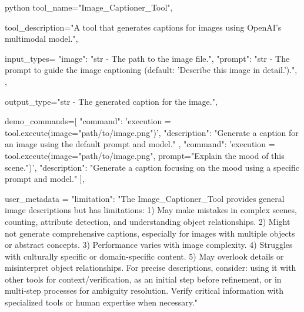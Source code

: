 \begin{codecolorbox}{python}
tool_name="Image_Captioner_Tool",

tool_description="A tool that generates captions for images using OpenAI's multimodal model.",

input_types={
    "image": "str - The path to the image file.",
    "prompt": "str - The prompt to guide the image captioning (default: 'Describe this image in detail.').",
},

output_type="str - The generated caption for the image.",

demo_commands=[
    {
        "command": 'execution = tool.execute(image="path/to/image.png")',
        "description": "Generate a caption for an image using the default prompt and model."
    },
    {
        "command": 'execution = tool.execute(image="path/to/image.png", prompt="Explain the mood of this scene.")',
        "description": "Generate a caption focusing on the mood using a specific prompt and model."
    }
],

user_metadata = {
    "limitation": "The Image_Captioner_Tool provides general image descriptions but has limitations: 1) May make mistakes in complex scenes, counting, attribute detection, and understanding object relationships. 2) Might not generate comprehensive captions, especially for images with multiple objects or abstract concepts. 3) Performance varies with image complexity. 4) Struggles with culturally specific or domain-specific content. 5) May overlook details or misinterpret object relationships. For precise descriptions, consider: using it with other tools for context/verification, as an initial step before refinement, or in multi-step processes for ambiguity resolution. Verify critical information with specialized tools or human expertise when necessary."
}
\end{codecolorbox}


